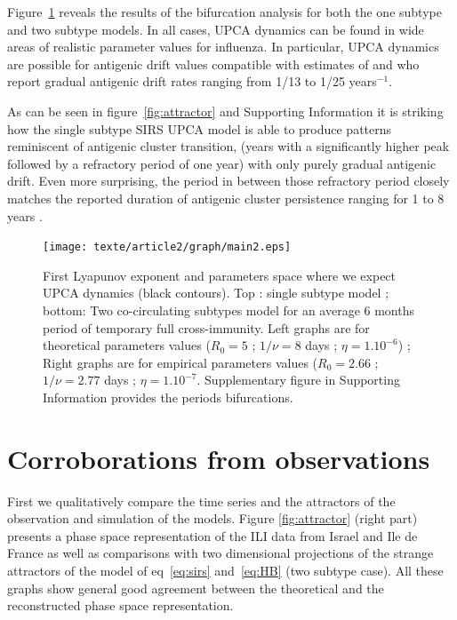 Figure~\ref{fig:main2} reveals the results of the bifurcation analysis
for both the one subtype and two subtype models. In all cases, UPCA
dynamics can be found in wide areas of realistic parameter values for
influenza. In particular, UPCA dynamics are possible for antigenic
drift values compatible with estimates of \citet{Finkenstaedt2005} and
\citep{Pease1987} who report gradual antigenic drift rates ranging
from 1/13 to 1/25 years$^{-1}$.

As can be seen in figure~\ref{fig:attractor} and Supporting
Information it is striking how the single subtype SIRS UPCA model is
able to produce patterns reminiscent of antigenic cluster transition,
(years with a significantly higher peak followed by a refractory
period of one year) with only purely gradual antigenic drift. Even
more surprising, the period in between those refractory period closely
matches the reported duration of antigenic cluster persistence ranging
for 1 to 8 years \citep{Smith2004}.

\begin{figure}[htbp]
  \center
  \texttt{[image: texte/article2/graph/main2.eps]}
  \caption{First Lyapunov exponent and parameters space where we
    expect UPCA dynamics (black contours). Top : single subtype model
    ; bottom: Two co-circulating subtypes model for an average 6
    months period of temporary full cross-immunity.  Left graphs are
    for theoretical parameters values ($R_0=5$ ; $1/\nu=8$ days ;
    $\eta=1.10^{-6}$) ; Right graphs are for empirical parameters
    values ($R_0=2.66$ ; $1/\nu=2.77$ days ;
    $\eta=1.10^{-7}$. Supplementary figure in Supporting Information
    provides the periods bifurcations.}
  \label{fig:main2}
\end{figure}


\section{Corroborations from observations}
\label{sec:confirmation}

First we qualitatively compare the time series and the attractors of
the observation and simulation of the models. Figure
\ref{fig:attractor} (right part) presents a phase space representation
of the ILI data from Israel and Ile de France as well as comparisons
with two dimensional projections of the strange attractors of the
model of eq~\eqref{eq:sirs} and~\eqref{eq:HB} (two subtype case). All
these graphs show general good agreement between the theoretical and
the reconstructed phase space representation.

